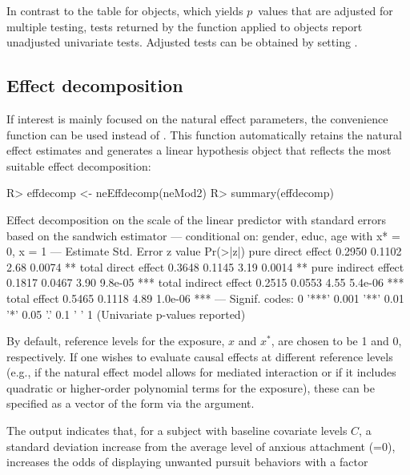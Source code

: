 \documentclass[nojss]{jss}
\begin{document}
In contrast to the  table for  objects, which yields $p$~values that are adjusted for multiple testing, tests returned by the  function applied to  objects report unadjusted univariate tests. Adjusted tests can be obtained by setting  \citep[for more details consult the help page of the  function from the  package;][]{R:multcomp}.

\subsection{Effect decomposition}\label{effdecomp}
If interest is mainly focused on the natural effect parameters, the convenience function  can be used instead of . This function automatically retains the natural effect estimates and generates a linear hypothesis object that reflects the most suitable effect decomposition:
\begin{Schunk}
\begin{Sinput}
R> effdecomp <- neEffdecomp(neMod2)
R> summary(effdecomp)
\end{Sinput}
\begin{Soutput}
Effect decomposition on the scale of the linear predictor
with standard errors based on the sandwich estimator
---
conditional on: gender, educ, age 
with x* = 0, x = 1 
---
                      Estimate Std. Error z value Pr(>|z|)    
pure direct effect      0.2950     0.1102    2.68   0.0074 ** 
total direct effect     0.3648     0.1145    3.19   0.0014 ** 
pure indirect effect    0.1817     0.0467    3.90  9.8e-05 ***
total indirect effect   0.2515     0.0553    4.55  5.4e-06 ***
total effect            0.5465     0.1118    4.89  1.0e-06 ***
---
Signif. codes:  0 '***' 0.001 '**' 0.01 '*' 0.05 '.' 0.1 ' ' 1
(Univariate p-values reported)
\end{Soutput}
\end{Schunk}
By default, reference levels for the exposure, $x$ and $x^*$, are chosen to be 1 and 0, respectively. If one wishes to evaluate causal effects at different reference levels (e.g., if the natural effect model allows for mediated interaction or if it includes quadratic or higher-order polynomial terms for the exposure), these can be specified as a vector of the form  via the  argument.
\par The output indicates that, for a subject with baseline covariate levels $C$, a standard deviation increase from the average level of anxious attachment (=0), increases the odds of displaying unwanted pursuit behaviors with a factor 
\end{document}
